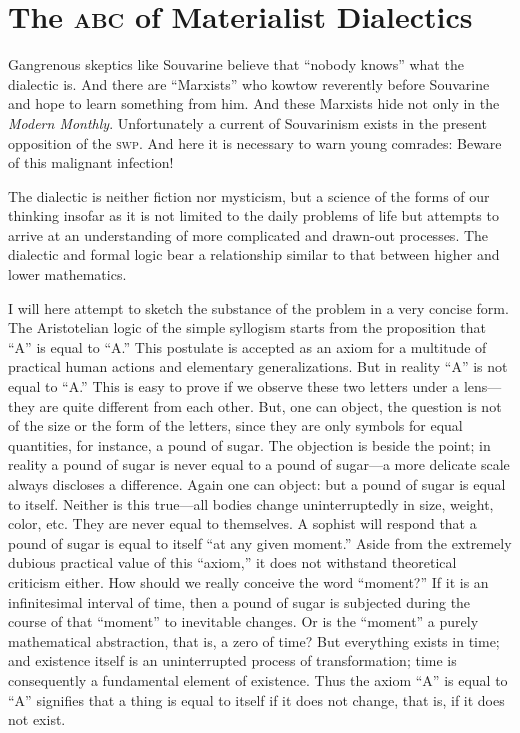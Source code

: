 \enlargethispage{\baselineskip}

\section*{The \textsc{abc} of Materialist Dialectics}

Gangrenous skeptics like Souvarine believe that “nobody knows” what the dialectic is. And there are “Marxists” who kowtow reverently before Souvarine and hope to learn something from him. And these Marxists hide not only in the \emph{Modern Monthly}. Unfortunately a current of Souvarinism exists in the present opposition of the \textsc{swp}. And here it is necessary to warn young comrades: Beware of this malignant infection!
\nowidow

The dialectic is neither fiction nor mysticism, but a science of the forms of our thinking insofar as it is not limited to the daily problems of life but attempts to arrive at an understanding of more complicated and drawn-out processes. The dialectic and formal logic bear a relationship similar to that between higher and lower mathematics.

I will here attempt to sketch the substance of the problem in a very concise form. The Aristotelian logic of the simple syllogism starts from the proposition that “A” is equal to “A.” This postulate is accepted as an axiom for a multitude of practical human actions and elementary generalizations. But in reality “A” is not equal to “A.” This is easy to prove if we observe these two letters under a lens---they are quite different from each other. But, one can object, the question is not of the size or the form of the letters, since they are only symbols for equal quantities, for instance, a pound of sugar. The objection is beside the point; in reality a pound of sugar is never equal to a pound of sugar---a more delicate scale always discloses a difference. Again one can object: but a pound of sugar is equal to itself. Neither is this true---all bodies change uninterruptedly in size, weight, color, etc. They are never equal to themselves. A sophist will respond that a pound of sugar is equal to itself “at any given moment.” Aside from the extremely dubious practical value of this “axiom,” it does not withstand theoretical criticism either. How should we really conceive the word ``moment?'' If it is an infinitesimal interval of time, then a pound of sugar is subjected during the course of that “moment” to inevitable changes. Or is the “moment” a purely mathematical abstraction, that is, a zero of time? But everything exists in time; and existence itself is an uninterrupted process of transformation; time is consequently a fundamental element of existence. Thus the axiom “A” is equal to “A” signifies that a thing is equal to itself if it does not change, that is, if it does not exist.

